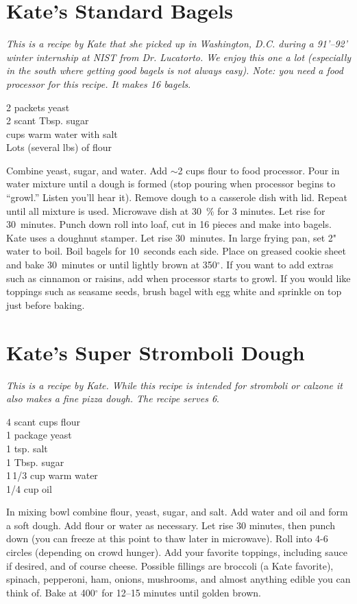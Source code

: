 \section{Kate's Standard Bagels}

\textit{This is a recipe by Kate that she picked up in Washington, 
D.C. during a 91'--92' winter internship at NIST from Dr. Lucatorto.  
We enjoy this  one a lot (especially in the south where getting good bagels 
is not always easy). Note: you need a food processor for this recipe. It
makes 16 bagels}.
\begin{ingredients}
2 packets yeast \\
2 scant Tbsp. sugar\\
 cups warm water with salt \\
Lots (several lbs) of flour
\end{ingredients}
Combine yeast, sugar, and water.  Add $\sim$2 cups flour to 
food processor. Pour in water mixture until a dough is formed 
(stop pouring when processor begins to ``growl.'' Listen you'll hear it). 
Remove dough to a
casserole dish with lid. Repeat until all mixture is used.  Microwave dish at
30~\% for 3 minutes.  Let rise  for 30~minutes.  Punch down roll into loaf, cut
in 16 pieces and  make into bagels. Kate uses a doughnut stamper. Let rise
30~minutes. In large frying pan, set 2" water to boil.  Boil bagels for
10~seconds each side.  Place on greased cookie sheet and bake 30~minutes or
until lightly brown at 350$^{\circ}$. If you want to add extras such as 
cinnamon or raisins, add when processor starts to growl. If you would
like toppings such as seasame seeds, brush bagel with egg white and
sprinkle on top just before baking.

\section{Kate's Super Stromboli Dough}

\textit{This is a recipe by Kate.  While this 
recipe is intended for stromboli or calzone it also makes a fine pizza 
dough.
The recipe serves 6}.
\begin{ingredients}
4 scant cups flour \\
1 package  yeast \\
1 tsp. salt \\
1 Tbsp. sugar \\
1\,1/3 cup warm water \\
1/4 cup oil
\end{ingredients}
In mixing bowl combine flour, yeast, sugar, and salt.  Add water and oil and 
form a soft dough. Add flour or water as necessary.  Let rise 30 minutes,
then punch down (you can freeze at this point to thaw later in microwave).
Roll into 4-6 circles (depending on crowd hunger). Add your favorite toppings,
including sauce if desired, and of course cheese. Possible fillings are 
broccoli (a Kate favorite), spinach,  pepperoni, ham, onions, mushrooms, and
almost anything edible you  can think of. Bake at 400$^{\circ}$ for 12--15
minutes until golden  brown. 


